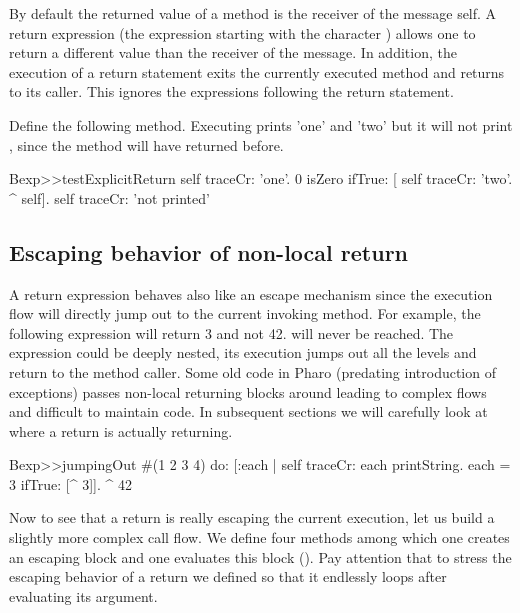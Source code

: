 \documentclass[a4paper,10pt,twoside]{book}
\begin{document}
By default the returned value of a method is the receiver of the message \ie self.
A return expression (the expression starting with the character \ct{^}) allows one to return a different value than the receiver of the message. In addition, the execution of a return statement exits the currently executed method and returns to its caller. This ignores the expressions following the return statement.

Define the following method. Executing   prints 'one' and 'two' but it will not print , since the method  will have returned before.

\begin{code}{}
Bexp>>testExplicitReturn
	self traceCr: 'one'.
	0 isZero ifTrue: [ self traceCr: 'two'. ^ self].
	self traceCr: 'not printed'
\end{code}


%
%


\subsection{Escaping behavior of non-local return}
A return expression behaves also like an escape mechanism since the execution flow will directly jump out to the current invoking method. For example, the following expression  will return 3 and not 42.  will never be reached. The expression \ct{[ ^3 ]} could be deeply nested, its execution jumps out all the levels and return to the method caller. Some old code  in Pharo (predating introduction of exceptions) passes non-local returning blocks around leading to complex flows and difficult to maintain code. In subsequent sections we will carefully look at where a return is actually returning.

\begin{code}{}
Bexp>>jumpingOut
	#(1 2 3 4) do: [:each |
					self traceCr: each printString.
					each = 3
						ifTrue: [^ 3]].
	^ 42
\end{code}

Now to see that a return is really escaping the current execution, let us build a slightly more complex call flow.
We define four methods among which one creates an escaping block  and one evaluates this block (). Pay attention that to stress the escaping behavior of a return we defined  so that it endlessly loops after evaluating its argument.
\end{document}
